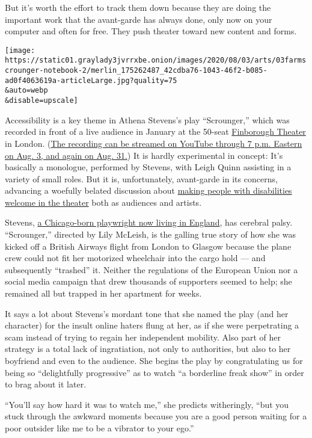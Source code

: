 But it's worth the effort to track them down because they are doing the
important work that the avant-garde has always done, only now on your
computer and often for free. They push theater toward new content and
forms.

\texttt{[image: https://static01.graylady3jvrrxbe.onion/images/2020/08/03/arts/03farmscrounger-notebook-2/merlin\_175262487\_42cdba76-1043-46f2-b085-ad0f4063619a-articleLarge.jpg?quality=75\\\&auto=webp\\\&disable=upscale]}

Accessibility is a key theme in Athena Stevens's play ``Scrounger,''
which was recorded in front of a live audience in January at the 50-seat
\href{https://finboroughtheatre.co.uk}{Finborough Theater} in London.
(\href{https://www.youtube.com/watch?v=1o8jvP5djME}{The recording can be
streamed on YouTube through 7 p.m. Eastern on Aug. 3, and again on Aug.
31.}) It is hardly experimental in concept: It's basically a monologue,
performed by Stevens, with Leigh Quinn assisting in a variety of small
roles. But it is, unfortunately, avant-garde in its concerns, advancing
a woefully belated discussion about
\href{https://www.nytimes3xbfgragh.onion/2020/01/13/theater/under-the-radar-festival-neurodiversity.html}{making
people with disabilities welcome in the theater} both as audiences and
artists.

Stevens, \href{https://www.athenastevens.com/}{a Chicago-born playwright
now living in England}, has cerebral palsy. ``Scrounger,'' directed by
Lily McLeish, is the galling true story of how she was kicked off a
British Airways flight from London to Glasgow because the plane crew
could not fit her motorized wheelchair into the cargo hold --- and
subsequently ``trashed'' it. Neither the regulations of the European
Union nor a social media campaign that drew thousands of supporters
seemed to help; she remained all but trapped in her apartment for weeks.

It says a lot about Stevens's mordant tone that she named the play (and
her character) for the insult online haters flung at her, as if she were
perpetrating a scam instead of trying to regain her independent
mobility. Also part of her strategy is a total lack of ingratiation, not
only to authorities, but also to her boyfriend and even to the audience.
She begins the play by congratulating us for being so ``delightfully
progressive'' as to watch ``a borderline freak show'' in order to brag
about it later.

``You'll say how hard it was to watch me,'' she predicts witheringly,
``but you stuck through the awkward moments because you are a good
person waiting for a poor outsider like me to be a vibrator to your
ego.''

